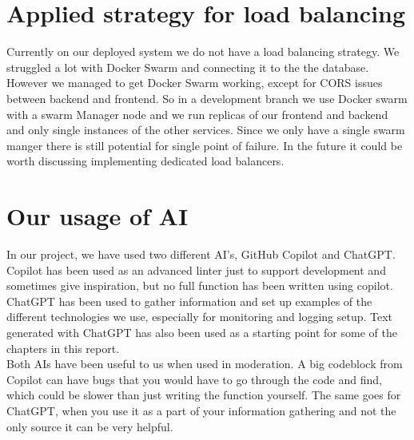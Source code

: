 \section{Applied strategy for load balancing}
Currently on our deployed system we do not have a load balancing strategy. We struggled a lot with Docker Swarm and connecting it to the the database. However we managed to get Docker Swarm working, except for CORS issues between backend and frontend. So in a development branch we use Docker swarm with a swarm Manager node and we run replicas of our frontend and backend and only single instances of the other services. Since we only have a single swarm manger there is still potential for single point of failure. In the future it could be worth discussing implementing dedicated load balancers. 

\section{Our usage of AI}
In our project, we have used two different AI's, GitHub Copilot and ChatGPT. Copilot has been used as an advanced linter just to support development and sometimes give inspiration, but no full function has been written using copilot. ChatGPT has been used to gather information and set up examples of the different technologies we use, especially for monitoring and logging setup. Text generated with ChatGPT has also been used as a starting point for some of the chapters in this report. \\

Both AIs have been useful to us when used in moderation. A big codeblock from Copilot can have bugs that you would have to go through the code and find, which could be slower than just writing the function yourself. The same goes for ChatGPT, when you use it as a part of your information gathering and not the only source it can be very helpful.


